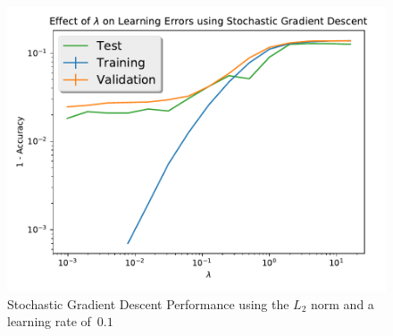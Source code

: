 \documentclass{report}
\begin{document}
  \begin{figure}[tb]
    \centering
    \includegraphics[scale=.5]{stochastic_GD_L2Norm}
    \caption{Stochastic Gradient Descent Performance using the $L_{2}$ norm and a learning rate of~$0.1$}\label{fig:stochasticGDL2}
  \end{figure}
  
  
\end{document}
